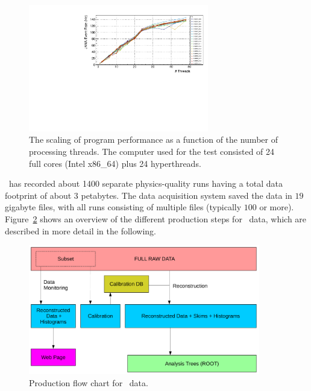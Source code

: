 \begin{figure}[h!]\centering
\includegraphics[width=0.7\textwidth]{figures/OfflineMonitor_PlotA.pdf}
\caption[]{\label{fig:offline_monitorA}The scaling of program performance as a function of the number of processing threads. The computer used for the test consisted of 24 full cores (Intel x86\_64) plus 24 hyperthreads.} 
\end{figure}

\GX~has recorded about 1400 separate physics-quality runs having a total data footprint of about 3 petabytes. The data acquisition system saved the data in $19$ gigabyte files, with all runs consisting of multiple files (typically $100$ or more). Figure~\ref{fig:production_overview} shows an overview of the different production steps for \GX~data, which are described in more detail in the following. 

\begin{figure}[h!]\centering
\includegraphics[width=0.9\textwidth]{figures/production_overview_calib_v2.pdf}
\caption[]{\label{fig:production_overview}Production flow chart for \GX~data.} 
\end{figure}

